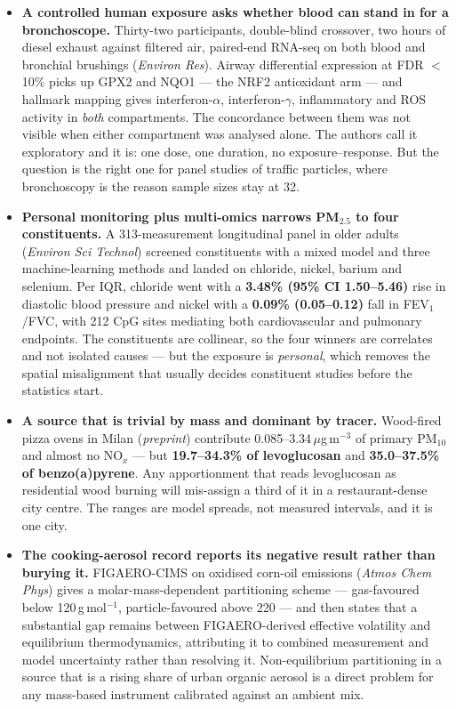 \documentclass[10pt]{article}
\begin{document}
\footnotesize
\begin{itemize}
\item \textbf{A controlled human exposure asks whether blood can stand in for a
bronchoscope.} Thirty-two participants, double-blind crossover, two hours of diesel exhaust
against filtered air, paired-end RNA-seq on both blood and bronchial brushings
(\textit{Environ Res}). Airway differential expression at FDR $<$ 10\% picks up GPX2 and
NQO1 --- the NRF2 antioxidant arm --- and hallmark mapping gives interferon-$\alpha$,
interferon-$\gamma$, inflammatory and ROS activity in \emph{both} compartments. The
concordance between them was not visible when either compartment was analysed alone. The
authors call it exploratory and it is: one dose, one duration, no exposure--response. But
the question is the right one for panel studies of traffic particles, where bronchoscopy
is the reason sample sizes stay at 32.

\item \textbf{Personal monitoring plus multi-omics narrows PM$_{2.5}$ to four
constituents.} A 313-measurement longitudinal panel in older adults
(\textit{Environ Sci Technol}) screened constituents with a mixed model and three
machine-learning methods and landed on chloride, nickel, barium and selenium. Per IQR,
chloride went with a \textbf{3.48\% (95\% CI 1.50--5.46)} rise in diastolic blood pressure
and nickel with a \textbf{0.09\% (0.05--0.12)} fall in FEV$_1$/FVC, with 212 CpG sites
mediating both cardiovascular and pulmonary endpoints. The constituents are collinear, so
the four winners are correlates and not isolated causes --- but the exposure is
\emph{personal}, which removes the spatial misalignment that usually decides
constituent studies before the statistics start.

\item \textbf{A source that is trivial by mass and dominant by tracer.} Wood-fired pizza
ovens in Milan (\textit{preprint}) contribute 0.085--3.34\,$\mu$g\,m$^{-3}$ of primary
PM$_{10}$ and almost no NO$_x$ --- but \textbf{19.7--34.3\% of levoglucosan} and
\textbf{35.0--37.5\% of benzo(a)pyrene}. Any apportionment that reads levoglucosan as
residential wood burning will mis-assign a third of it in a restaurant-dense city centre.
The ranges are model spreads, not measured intervals, and it is one city.

\item \textbf{The cooking-aerosol record reports its negative result rather than burying
it.} FIGAERO-CIMS on oxidised corn-oil emissions (\textit{Atmos Chem Phys}) gives a
molar-mass-dependent partitioning scheme --- gas-favoured below 120\,g\,mol$^{-1}$,
particle-favoured above 220 --- and then states that a substantial gap remains between
FIGAERO-derived effective volatility and equilibrium thermodynamics, attributing it to
combined measurement and model uncertainty rather than resolving it. Non-equilibrium
partitioning in a source that is a rising share of urban organic aerosol is a direct
problem for any mass-based instrument calibrated against an ambient mix.


\end{itemize}
\end{document}

